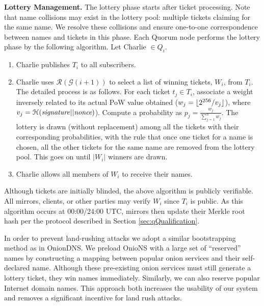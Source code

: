 \documentclass[USenglish,oneside,twocolumn]{article}
\DeclarePairedDelimiter{\floor}{\lfloor}{\rfloor}
\begin{document}
%
\textbf{Lottery Management.} The lottery phase starts after ticket processing. Note that name collisions may exist in the lottery pool: multiple tickets claiming for the same name. We resolve these collisions and ensure one-to-one correspondence between names and tickets in this phase. Each Quorum node performs the lottery phase by the following algorithm. Let Charlie $ \in Q_{i} $.

\begin{enumerate}
	\item Charlie publishes $ T_{i} $ to all subscribers.
	\item Charlie uses $ \mathcal{R}(\mathcal{G}(i + 1)) $ to select a list of winning tickets, $ W_{i} $, from $ T_{i} $.  The detailed process is as follows. For each ticket  $t_j\in T_{i}$, associate a weight inversely related to its actual PoW value obtained ($w_j=\floor{2^{256}/v_j}$), where $v_j=\mathcal{H}(\mathit{signature}||\emph{nonce})$).  Compute a probability as $p_j=\frac{w_{j}}{\sum_{j=1}^n{w_{j}}}$. The lottery is drawn (without replacement) among all the tickets with their corresponding probabilities, with the rule that once one ticket for a name is chosen, all the other tickets for the same name are removed from the lottery pool. This goes on until $ |W_{i}|$ winners are drawn.
	\item Charlie allows all members of $ W_{i} $ to receive their names.
\end{enumerate}

Although tickets are initially blinded, the above algorithm is publicly verifiable. All mirrors, clients, or other parties may verify $ W_{i} $ since $ T_{i} $ is public. As this algorithm occurs at 00:00/24:00 UTC, mirrors then update their Merkle root hash per the protocol described in Section \ref{sec:qQualification}.

In order to prevent land-rushing attacks we adopt a similar bootstrapping method as in OnionDNS. We preload OnioNS with a large set of ``reserved'' names by constructing a mapping between popular onion services and their self-declared name. Although these pre-existing onion services must still generate a lottery ticket, they win names immediately. Similarly, we can also reserve popular Internet domain names. This approach both increases the usability of our system and removes a significant incentive for land rush attacks. 
\end{document}
